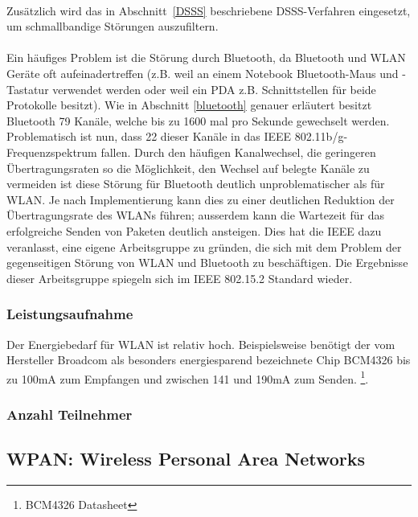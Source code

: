            \\
            Zusätzlich wird das in Abschnitt~\ref{DSSS} beschriebene DSSS-Verfahren
            eingesetzt, um schmallbandige Störungen auszufiltern. \\
            \\
            Ein häufiges Problem ist die Störung durch Bluetooth, da 
            Bluetooth und WLAN Geräte oft aufeinadertreffen (z.B. weil an einem
            Notebook Bluetooth-Maus und -Tastatur verwendet werden oder weil 
            ein PDA z.B. Schnittstellen für beide Protokolle besitzt).
            Wie in Abschnitt \ref{bluetooth} genauer erläutert besitzt Bluetooth
            79 Kanäle, welche bis zu 1600 mal pro Sekunde gewechselt werden.
            Problematisch ist nun, dass 22 dieser Kanäle in das 
            IEEE 802.11b/g-Frequenzspektrum fallen. Durch den häufigen
            Kanalwechsel, die geringeren Übertragungsraten so die 
            Möglichkeit, den Wechsel auf belegte Kanäle zu vermeiden ist diese
            Störung für Bluetooth deutlich unproblematischer als für WLAN. 
            Je nach Implementierung kann dies zu einer deutlichen Reduktion
            der Übertragungsrate des WLANs führen; ausserdem kann die Wartezeit
            für das erfolgreiche Senden von Paketen deutlich ansteigen.
            Dies hat die IEEE dazu veranlasst, eine eigene Arbeitsgruppe
            zu gründen, die sich mit dem Problem der gegenseitigen Störung
            von WLAN und Bluetooth zu beschäftigen. Die Ergebnisse dieser
            Arbeitsgruppe spiegeln sich im IEEE 802.15.2 Standard wieder.

        \subsubsection{Leistungsaufnahme}
            Der Energiebedarf für WLAN ist relativ hoch. Beispielsweise benötigt der
            vom Hersteller Broadcom als besonders energiesparend bezeichnete Chip
            BCM4326 bis zu 100mA zum Empfangen und zwischen 141 und 190mA zum Senden.
            \footnote{BCM4326 Datasheet}. 

        \subsubsection{Anzahl Teilnehmer}

    \subsection{WPAN: Wireless Personal Area Networks}
